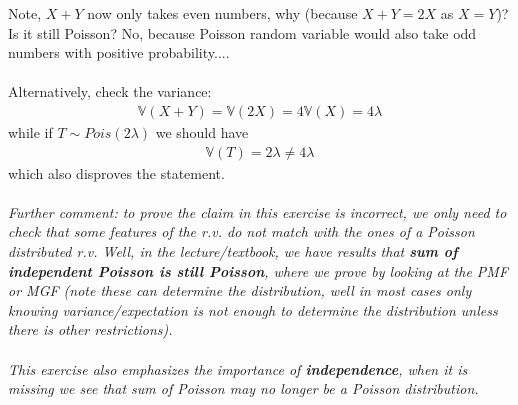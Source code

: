 
\setcounter{theorem}{26}
\begin{exercise} [BH.4.27]
\begin{solution}
    Note, $X+Y$ now only takes even numbers, why (because $X+Y=2X$ as $X=Y$)? Is it still Poisson? No, because Poisson random variable would also take odd numbers with positive probability....\\~\\
	Alternatively, check the variance:
	\begin{align*}
		\mathbb{V}(X+Y) =\mathbb{V}(2X) =
		4\mathbb{V}(X) =4\lambda
	\end{align*}
	while if $T\sim Pois(2\lambda)$ we should have
	\begin{align*}
		\mathbb{V}(T) =2\lambda \neq 4\lambda
	\end{align*}
	which also disproves the statement. \\~\\
	\textit{Further comment: to prove the  claim in this exercise is incorrect, we only need to check that some features of the r.v. do not match with the ones of a Poisson distributed r.v. Well, in the lecture/textbook, we have results that \textbf{sum of independent Poisson is still Poisson}, where we prove by looking at the PMF or MGF (note these can determine the distribution, well in most cases only knowing variance/expectation is not enough to determine the distribution unless there is other restrictions). \\~\\This exercise also emphasizes the importance of \textbf{independence}, when it is missing we see that sum of Poisson may no longer be a Poisson distribution.}
\end{solution}
\end{exercise}

